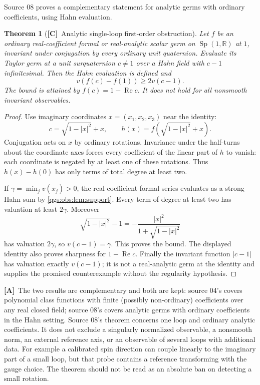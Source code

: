 \documentclass[11pt,oneside]{article}
\numberwithin{equation}{section}
\theoremstyle{plain}
\newtheorem{theorem}{Theorem}[section]
\theoremstyle{definition}
\theoremstyle{remark}
\newcommand{\R}{\mathbb R}
\DeclareMathOperator{\Rea}{Re}
\DeclareMathOperator{\Sp}{Sp}
\newcommand{\abs}[1]{\left|#1\right|}
\newcommand{\TC}{\textcolor{TierC}{\textsf{\bfseries[C]}}}
\newcommand{\TA}{\textcolor{TierA}{\textsf{\bfseries[A]}}}
\begin{document}
Source 08 proves a complementary statement for analytic germs with ordinary coefficients, using Hahn evaluation.

\begin{theorem}[\TC\ Analytic single-loop first-order obstruction]\label{qgs:ops:thm:invariant}
Let $f$ be an ordinary real-coefficient formal or real-analytic scalar germ on $\Sp(1,\R)$ at $1$, invariant under conjugation by every ordinary unit quaternion. Evaluate its Taylor germ at a unit surquaternion $c\ne1$ over a Hahn field with $c-1$ infinitesimal. Then the Hahn evaluation is defined and
\begin{equation}\label{qgs:ops:eq:invariant-order}
 v(f(c)-f(1))\ge2v(c-1).
\end{equation}
The bound is attained by $f(c)=1-\Rea c$. It does not hold for all nonsmooth invariant observables.
\end{theorem}
\begin{proof}
Use imaginary coordinates $x=(x_1,x_2,x_3)$ near the identity:
\[
 c=\sqrt{1-\abs x^2}+x,
 \qquad h(x)=f(\sqrt{1-\abs x^2}+x).
\]
Conjugation acts on $x$ by ordinary rotations. Invariance under the half-turns about the coordinate axes forces every coefficient of the linear part of $h$ to vanish: each coordinate is negated by at least one of these rotations. Thus $h(x)-h(0)$ has only terms of total degree at least two.

If $\gamma=\min_jv(x_j)>0$, the real-coefficient formal series evaluates as a strong Hahn sum by \cref{qgs:obs:lem:support}. Every term of degree at least two has valuation at least $2\gamma$. Moreover
\[
 \sqrt{1-\abs x^2}-1=-\frac{\abs x^2}{1+\sqrt{1-\abs x^2}}
\]
has valuation $2\gamma$, so $v(c-1)=\gamma$. This proves the bound. The displayed identity also proves sharpness for $1-\Rea c$. Finally the invariant function $\abs{c-1}$ has valuation exactly $v(c-1)$; it is not a real-analytic germ at the identity and supplies the promised counterexample without the regularity hypothesis.
\end{proof}

\TA\ The two results are complementary and both are kept: source 04's covers polynomial class functions with finite (possibly non-ordinary) coefficients over any real closed field; source 08's covers analytic germs with ordinary coefficients in the Hahn setting. Source 08's theorem concerns one loop and ordinary analytic coefficients. It does not exclude a singularly normalized observable, a nonsmooth norm, an external reference axis, or an observable of several loops with additional data. For example a calibrated spin direction can couple linearly to the imaginary part of a small loop, but that probe contains a reference transforming with the gauge choice. The theorem should not be read as an absolute ban on detecting a small rotation.
\end{document}
